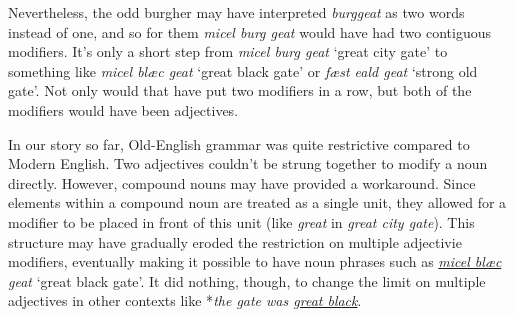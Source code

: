 
Nevertheless, the odd burgher may have interpreted \textit{burggeat} as two words instead of one, and so for them \textit{micel burg geat} would have had two contiguous modifiers. It's only a short step from \textit{micel burg geat} `great city gate' to something like \textit{micel blæc geat} `great black gate' or \textit{fæst eald geat} `strong old gate'. Not only would that have put two modifiers in a row, but both of the modifiers would have been adjectives.



In our story so far, Old-English grammar was quite restrictive compared to Modern English. Two adjectives couldn't be strung together to modify a noun directly. However, compound nouns may have provided a workaround. Since elements within a compound noun are treated as a single unit, they allowed for a modifier to be placed in front of this unit (like \textit{great} in \textit{great city gate}). This structure may have gradually eroded the restriction on multiple adjectivie modifiers, eventually making it possible to have noun phrases such as \textit{\uline{micel blæc} geat} `great black gate'. It did nothing, though, to change the limit on multiple adjectives in other contexts like *\textit{the gate was \uline{great black}}.

